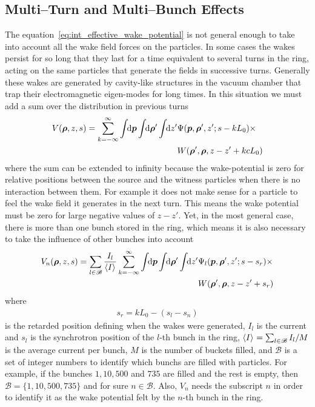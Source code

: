 \subsection{Multi--Turn and Multi--Bunch Effects}\label{ssec:multi_bunch_effects}

    The equation~\eqref{eq:int_effective_wake_potential} is not general enough to take into account all the wake field forces on the particles. In some cases the wakes persist for so long that they last for a time equivalent to several turns in the ring, acting on the same particles that generate the fields in successive turns. Generally these wakes are generated by cavity-like structures in the vacuum chamber that trap their electromagnetic eigen-modes for long times. In this situation we must add a sum over the distribution in previous turns
    \begin{align}\nonumber
  	  	V(\boldsymbol{\rho}, z, s) = \sum_{k=-\infty}^\infty\int\!\!\text{d}\boldsymbol{p} \int\!\!\text{d}\boldsymbol{\rho}' \int\!\!\text{d}z' 
	  			&\Psi(\boldsymbol{p},\boldsymbol{\rho}',z'; s-kL_0)\times\\ &W(\boldsymbol{\rho}',\boldsymbol{\rho},z-z' + kcL_0)
    \end{align}
    where the sum can be extended to infinity because the wake-potential is zero for relative positions between the source and the witness particles when there is no interaction between them. For example it does not make sense for a particle to feel the wake field it generates in the next turn. This means the wake potential must be zero for large negative values of $z-z'$. Yet, in the most general case, there is more than one bunch stored in the ring, which means it is also necessary to take the influence of other bunches into account
    \begin{align}\label{eq:general_eff_wake_pot}\nonumber
  	  	V_n(\boldsymbol{\rho}, z, s) = \sum_{l\in\mathscr{B}}\frac{I_l}{\left\langle I \right\rangle_{{}}}\sum_{k=-\infty}^\infty\int\!\!\text{d}\boldsymbol{p} \int\!\!\text{d}\boldsymbol{\rho}' \int\!\!\text{d}z' 
	  			&\Psi_l(\boldsymbol{p},\boldsymbol{\rho}',z'; s - s_r) \times\\
				&W(\boldsymbol{\rho}',\boldsymbol{\rho},z - z' + s_r)
    \end{align}
    where
    \begin{align}\label{eq:retarded_time_definition}
        s_r = kL_0-(s_l-s_n)
    \end{align}
    is the retarded position defining when the wakes were generated, $I_l$ is the current and $s_l$ is the synchrotron position of the $l$-th bunch in the ring, $\left\langle I \right\rangle_{{}}=\sum_{l\in\mathscr{B}}I_l/M$ is the average current per bunch, $M$ is the number of buckets filled, and $\mathscr{B}$ is a set of integer numbers to identify which bunchs are filled with particles. For example, if the bunches $1, 10, 500$ and $735$ are filled and the rest is empty, then $\mathscr{B} = \{ 1, 10, 500, 735 \}$ and for sure $n\in\mathscr{B}$. Also, $V_n$ needs the subscript $n$ in order to identify it as the wake potential felt by the $n$-th bunch in the ring.

